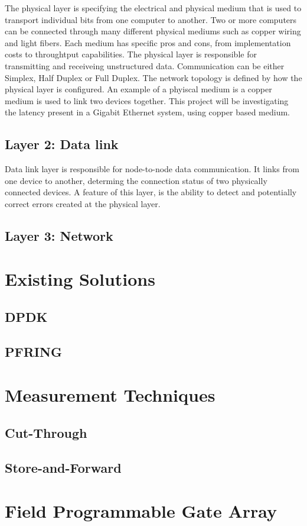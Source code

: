 \par The physical layer is specifying the electrical and physical medium that is used to transport individual bits from one computer to another.
Two or more computers can be connected through many different physical mediums such as copper wiring and light fibers. 
Each medium has specific pros and cons, from implementation costs to throughtput capabilities.
The physical layer is responsible for transmitting and receiveing unstructured data.
Communication can be either Simplex, Half Duplex or Full Duplex.
The network topology is defined by how the physical layer is configured.
An example of a phyiscal medium is a copper medium is used to link two devices together.
This project will be investigating the latency present in a Gigabit Ethernet system, using copper based medium.

\subsection{Layer 2: Data link}

Data link layer is responsible for node-to-node data communication. 
It links from one device to another, determing the connection status of two physically connected devices.
A feature of this layer, is the ability to detect and potentially correct errors created at the physical layer.
\cite{IEEE802}

\subsection{Layer 3: Network}

\section{Existing Solutions}

\subsection{DPDK}

\subsection{PF\textunderscore RING}

\section{Measurement Techniques}

\subsection{Cut-Through}

\subsection{Store-and-Forward}

\section{Field Programmable Gate Array}
